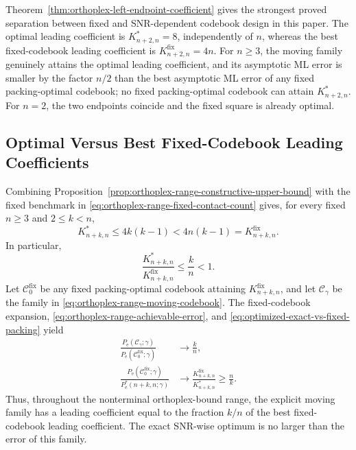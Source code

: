 \documentclass[12pt,draftclsnofoot,onecolumn]{IEEEtran}
\newcommand{\cC}{\mathcal{C}}
\newcommand{\Pe}{P_{\mathrm e}}
\theoremstyle{definition}
\begin{document}
Theorem~\ref{thm:orthoplex-left-endpoint-coefficient} gives the
strongest proved separation between fixed and SNR-dependent codebook design in
this paper.  The optimal leading coefficient is
\(K^{\ast}_{n+2,n}=8\), independently of \(n\), whereas the best
fixed-codebook leading coefficient is \(K^{\mathrm{fix}}_{n+2,n}=4n\).
For \(n\ge3\), the moving family genuinely attains the optimal leading
coefficient, and its asymptotic ML error is smaller by the factor \(n/2\)
than the best asymptotic ML error of any fixed packing-optimal codebook;
no fixed packing-optimal codebook can attain
\(K^{\ast}_{n+2,n}\).  For \(n=2\), the two endpoints coincide and the fixed
square is already optimal.


 


\subsection{Optimal Versus Best Fixed-Codebook Leading Coefficients}
\label{subsec:orthoplex-range-fixed-comparison}

Combining Proposition~\ref{prop:orthoplex-range-constructive-upper-bound}
with the fixed benchmark in
\eqref{eq:orthoplex-range-fixed-contact-count} gives, for every fixed
\(n\ge3\) and \(2\leq k<n\),
\begin{equation}
  K^{\ast}_{n+k,n}
  \leq4k(k-1)
  <4n(k-1)
  =K^{\mathrm{fix}}_{n+k,n}.
  \label{eq:orthoplex-range-strict-improvement}
\end{equation}
In particular,
\begin{equation}
  \frac{K^{\ast}_{n+k,n}}
       {K^{\mathrm{fix}}_{n+k,n}}
  \leq\frac{k}{n}<1.
  \label{eq:orthoplex-range-coefficient-ratio-bound}
\end{equation}
Let \(\cC_0^{\mathrm{fix}}\) be any fixed packing-optimal codebook
attaining \(K^{\mathrm{fix}}_{n+k,n}\), and let \(\cC_\gamma\) be the
family in \eqref{eq:orthoplex-range-moving-codebook}.  The fixed-codebook
expansion, \eqref{eq:orthoplex-range-achievable-error}, and
\eqref{eq:optimized-exact-vs-fixed-packing} yield
\begin{equation}
\begin{aligned}
  \frac{\Pe(\cC_\gamma;\gamma)}
       {\Pe(\cC_0^{\mathrm{fix}};\gamma)}
  &\longrightarrow\frac{k}{n},\\
  \frac{\Pe(\cC_0^{\mathrm{fix}};\gamma)}
       {\Pe^{\ast}(n+k,n;\gamma)}
  &\longrightarrow
  \frac{K^{\mathrm{fix}}_{n+k,n}}{K^{\ast}_{n+k,n}}
  \geq\frac{n}{k}.
\end{aligned}
  \label{eq:orthoplex-range-error-comparisons}
\end{equation}
Thus, throughout the nonterminal orthoplex-bound range, the explicit moving
family has a leading coefficient equal to the fraction \(k/n\) of the best
fixed-codebook leading coefficient.  The exact SNR-wise optimum is no larger
than the error of this family.
\end{document}
